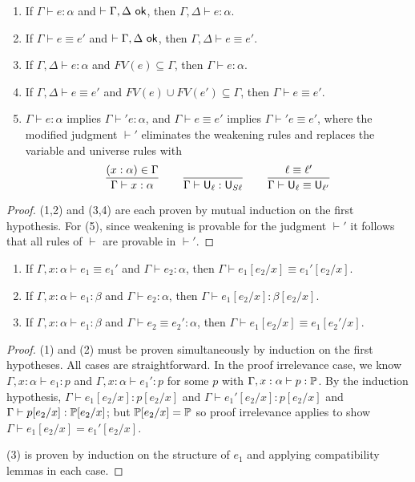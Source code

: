 \begin{lemma}[Weakening]\label{thm:weak}
\begin{enumerate}
\item If $\Gamma\vdash e:\alpha$ and $\vdash\Gamma,\Delta\ok$, then $\Gamma,\Delta\vdash e:\alpha$.
\item If $\Gamma\vdash e\equiv e'$ and $\vdash\Gamma,\Delta\ok$, then $\Gamma,\Delta\vdash e\equiv e'$.
\item If $\Gamma,\Delta\vdash e:\alpha$ and $FV(e)\subseteq\Gamma$, then $\Gamma\vdash e:\alpha$.
\item If $\Gamma,\Delta\vdash e\equiv e'$ and $FV(e)\cup FV(e')\subseteq\Gamma$, then $\Gamma\vdash e\equiv e'$.
\item $\Gamma\vdash e:\alpha$ implies $\Gamma\vdash' e:\alpha$, and $\Gamma\vdash e\equiv e'$ implies $\Gamma\vdash' e\equiv e'$, where the modified judgment $\vdash'$ eliminates the weakening rules and replaces the variable and universe rules with
$$\frac{(x:\alpha)\in\Gamma}{\Gamma\vdash x:\alpha}\qquad\frac{}{\Gamma\vdash \U_\ell:\U_{S\ell}}\qquad\frac{\ell\equiv\ell'}{\Gamma\vdash \U_\ell\equiv\U_{\ell'}}$$
\end{enumerate}
\end{lemma}
\begin{proof}
(1,2) and (3,4) are each proven by mutual induction on the first hypothesis. For (5), since weakening is provable for the judgment $\vdash'$ it follows that all rules of $\vdash$ are provable in $\vdash'$.
\end{proof}

\begin{lemma}\label{thm:subst}
\begin{enumerate}
\item If $\Gamma,x:\alpha\vdash e_1\equiv e_1'$ and $\Gamma\vdash e_2:\alpha$, then $\Gamma\vdash e_1[e_2/x]\equiv e_1'[e_2/x]$.
\item\label{item:subst_ty} If $\Gamma,x:\alpha\vdash e_1:\beta$ and $\Gamma\vdash e_2:\alpha$, then $\Gamma\vdash e_1[e_2/x]:\beta[e_2/x]$.
\item If $\Gamma,x:\alpha\vdash e_1:\beta$ and $\Gamma\vdash e_2\equiv e_2':\alpha$, then $\Gamma\vdash e_1[e_2/x]\equiv e_1[e_2'/x]$.
\end{enumerate}
\end{lemma}
\begin{proof} (1) and (2) must be proven simultaneously by induction on the first hypotheses. All cases are straightforward. In the proof irrelevance case, we know $\Gamma,x:\alpha\vdash e_1:p$ and $\Gamma,x:\alpha\vdash e_1':p$ for some $p$ with $\Gamma,x:\alpha\vdash p:\P$. By the induction hypothesis, $\Gamma\vdash e_1[e_2/x]:p[e_2/x]$ and $\Gamma\vdash e_1'[e_2/x]:p[e_2/x]$ and $\Gamma\vdash p[e_2/x]:\P[e_2/x]$; but $\P[e_2/x]=\P$ so proof irrelevance applies to show $\Gamma\vdash e_1[e_2/x]=e_1'[e_2/x]$.

(3) is proven by induction on the structure of $e_1$ and applying compatibility lemmas in each case.
\end{proof}

